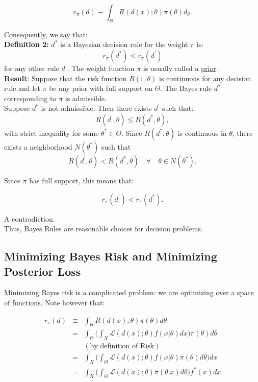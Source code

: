 \documentclass[12] {article}
\begin{document}
\begin{equation}
r_{\pi}(d) \equiv \int_{\Theta} R(d(x); \theta ) \pi(\theta) d_{\theta}. 
\end{equation}

\noindent Consequently, we say that: \\

\noindent \textbf{Definition 2:} $d^*$ is a Bayesian decision rule for the weight $\pi$ is:
\[ r_{\pi}(d^*) \leq r_{\pi}(d^{\prime})  \]
for any other rule $d^{\prime}$. The weight function $\pi$ is usually called a \underline{prior}.\\

\noindent \textbf{Result}: Suppose that the risk function $R(:, \theta)$ is continuous for any decision rule and let $\pi$ be any prior with full support on $\Theta$. The Bayes rule $d^*$ corresponding to $\pi$ is admissible. \\

 Suppose $d^*$ is not admissible. Then there exists $d^{\prime}$ such that:
\[ R(d^{\prime}, \theta) \leq R(d^*, \theta),  \]
with strict inequality for some $\theta^* \in \Theta$. Since $R(d^*,\theta)$ is continuous in $\theta$, there exists a neighborhood $N(\theta^*)$ such that 
\[  R(d^{\prime}, \theta) < R(d^*, \theta) \quad \forall \quad \theta \in N(\theta^*). \]

\noindent Since $\pi$ has full support, this means that:

\[ r_{\pi}(d^{\prime}) < r_{\pi}(d^*).   \]

\noindent A contradiction. \\

\noindent Thus, Bayes Rules are reasonable choices for decision problems. 

\subsection{Minimizing Bayes Risk and Minimizing Posterior Loss}

Minimizing Bayes risk is a complicated problem: we are optimizing over a space of functions. Note however that:

\begin{eqnarray*}
r_{\pi}(d) &\equiv& \int_{\Theta} R(d(x); \theta ) \pi(\theta) d{\theta} \\
&=&  \int_{\Theta}\Big( \int_{X} \mathcal{L}(d(x); \theta) f(x| \theta) d x  \Big)  \pi(\theta) d{\theta} \\
&& (\textrm{by definition of Risk}) \\
&=& \int_{X}   \Big( \int_{\Theta} \mathcal{L}(d(x); \theta) f(x| \theta) \pi(\theta) d \theta  \Big)   dx \\
&=& \int_{X}   \Big( \int_{\Theta} \mathcal{L}(d(x); \theta)\pi (\theta | x) d \theta  \Big) f^*(x)  dx
\end{eqnarray*}
\end{document}
